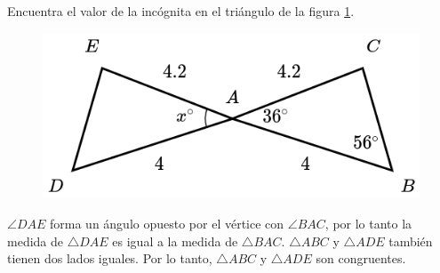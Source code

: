 Encuentra el valor de la incógnita en el triángulo de la figura \ref{fig:angle_triangle_34}.

\begin{minipage}[t][][t]{0.35\textwidth}
    \begin{figure}[H]
        \centering
        \includegraphics[width=0.9\linewidth]{../images/angle_triangle_34.png}

        \caption{}
        \label{fig:angle_triangle_34}
    \end{figure}
\end{minipage}\hfill
\begin{minipage}[t][][t]{0.6\textwidth}
    \begin{solutionbox}{3cm}
        $\angle DAE$ forma un ángulo opuesto por el vértice con $\angle BAC$, por lo tanto la medida de
        $\triangle DAE$ es igual a la medida de $\triangle BAC$.
        $\triangle ABC$ y $\triangle ADE$ también tienen dos lados iguales. Por lo tanto,
        $\triangle ABC$ y $\triangle ADE$ son congruentes.
    \end{solutionbox}
\end{minipage}
